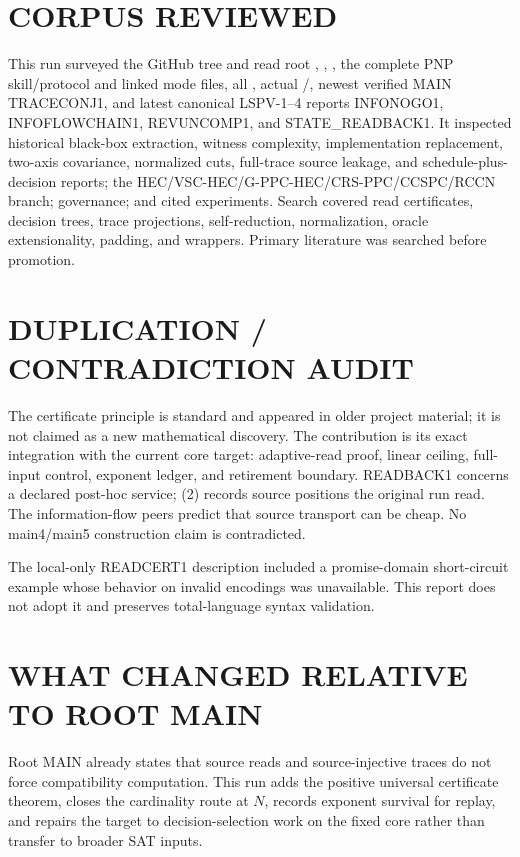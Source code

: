 \documentclass[11pt]{article}
\begin{document}
\section{CORPUS REVIEWED}
This run surveyed the GitHub tree and read root ,
, , the complete PNP skill/protocol and linked
mode files, all , actual /, newest
verified MAIN TRACECONJ1, and latest canonical LSPV-1--4 reports INFONOGO1,
INFOFLOWCHAIN1, REVUNCOMP1, and STATE\_READBACK1.  It inspected historical
black-box extraction, witness complexity, implementation replacement,
two-axis covariance, normalized cuts, full-trace source leakage, and
schedule-plus-decision reports; the HEC/VSC-HEC/G-PPC-HEC/CRS-PPC/CCSPC/RCCN
branch; governance; and cited experiments.  Search covered read certificates,
decision trees, trace projections, self-reduction, normalization, oracle
extensionality, padding, and wrappers.  Primary literature was searched before
promotion.

\section{DUPLICATION / CONTRADICTION AUDIT}
The certificate principle is standard and appeared in older project material;
it is not claimed as a new mathematical discovery.  The contribution is its
exact integration with the current core target: adaptive-read proof, linear
ceiling, full-input control, exponent ledger, and retirement boundary.
READBACK1 concerns a declared post-hoc service; (2) records source positions
the original run read.  The information-flow peers predict that source
transport can be cheap.  No main4/main5 construction claim is contradicted.

The local-only READCERT1 description included a promise-domain short-circuit
example whose behavior on invalid encodings was unavailable.  This report does
not adopt it and preserves total-language syntax validation.

\section{WHAT CHANGED RELATIVE TO ROOT MAIN}
Root MAIN already states that source reads and source-injective traces do not
force compatibility computation.  This run adds the positive universal
certificate theorem, closes the cardinality route at \(N\), records exponent
survival for replay, and repairs the target to decision-selection work on the
fixed core rather than transfer to broader SAT inputs.
\end{document}
